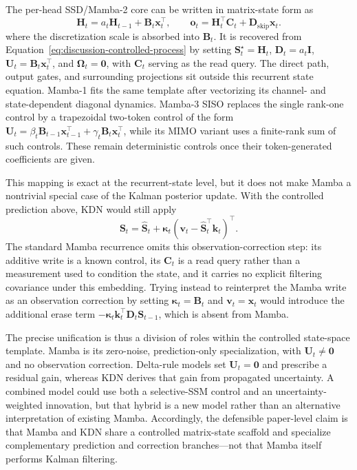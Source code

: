 \documentclass[11pt]{article}
\newcommand{\vct}[1]{\boldsymbol{#1}}
\begin{document}
The per-head SSD/Mamba-2 core can be written in matrix-state form as
\begin{equation}
  \vct{H}_t
  =a_t\vct{H}_{t-1}+\vct{B}_t\vct{x}_t^\top,
  \qquad
  \vct{o}_t
  =\vct{H}_t^\top\vct{C}_t+\vct{D}_{\mathrm{skip}}\vct{x}_t.
  \label{eq:discussion-mamba-ssd}
\end{equation}
where the discretization scale is absorbed into $\vct{B}_t$.
It is recovered from Equation~\eqref{eq:discussion-controlled-process} by setting
$\vct{S}_t^\star=\vct{H}_t$, $\vct{D}_t=a_t\vct{I}$,
$\vct{U}_t=\vct{B}_t\vct{x}_t^\top$, and $\vct{\Omega}_t=\vct{0}$, with
$\vct{C}_t$ serving as the read query. The direct path, output gates, and surrounding projections
sit outside this recurrent state equation. Mamba-1 fits the same template after vectorizing its
channel- and state-dependent diagonal dynamics. Mamba-3 SISO replaces the single rank-one control
by a trapezoidal two-token control of the form
$\vct{U}_t=\beta_t\vct{B}_{t-1}\vct{x}_{t-1}^\top
+\gamma_t\vct{B}_t\vct{x}_t^\top$, while its MIMO variant uses a finite-rank sum of such
controls. These remain deterministic controls once their token-generated coefficients are given.

This mapping is exact at the recurrent-state level, but it does not make Mamba a nontrivial
special case of the Kalman posterior update. With the controlled prediction above, KDN would
still apply
\begin{equation}
  \vct{S}_t
  =\widehat{\vct{S}}_t
   +\vct{\kappa}_t
    \left(\vct{v}_t-\widehat{\vct{S}}_t^\top\vct{k}_t\right)^\top.
  \label{eq:discussion-controlled-correction}
\end{equation}
The standard Mamba recurrence omits this observation-correction step: its additive write is a
known control, its $\vct{C}_t$ is a read query rather than a measurement used to condition the
state, and it carries no explicit filtering covariance under this embedding. Trying instead to
reinterpret the Mamba write as an observation correction by setting
$\vct{\kappa}_t=\vct{B}_t$ and $\vct{v}_t=\vct{x}_t$ would introduce the additional erase term
$-\vct{\kappa}_t\vct{k}_t^\top\vct{D}_t\vct{S}_{t-1}$, which is absent from Mamba.

The precise unification is thus a division of roles within the controlled state-space template.
Mamba is its zero-noise, prediction-only specialization, with $\vct{U}_t\neq\vct{0}$ and no
observation correction. Delta-rule models set $\vct{U}_t=\vct{0}$ and prescribe a residual gain,
whereas KDN derives that gain from propagated uncertainty. A combined model could use both a
selective-SSM control and an uncertainty-weighted innovation, but that hybrid is a new model rather
than an alternative interpretation of existing Mamba. Accordingly, the defensible paper-level
claim is that Mamba and KDN share a controlled matrix-state scaffold and specialize complementary
prediction and correction branches---not that Mamba itself performs Kalman filtering.
\end{document}
